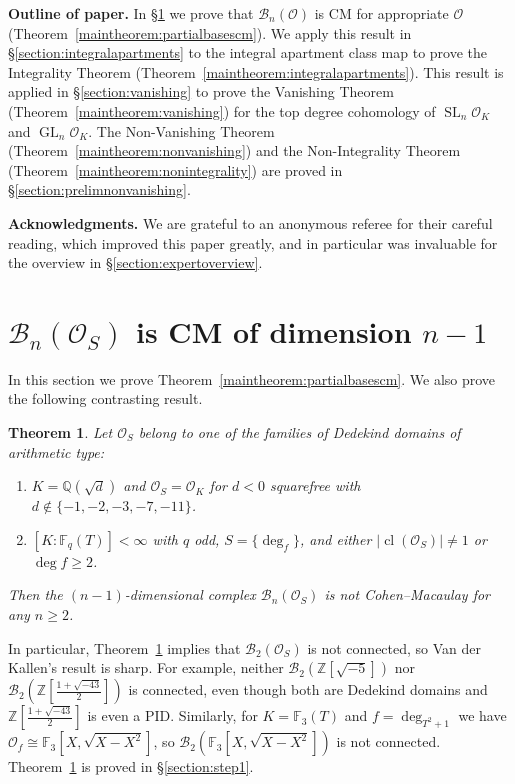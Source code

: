 \documentclass[11 pt]{article}
\theoremstyle{plain}
\newtheorem{theorem}{Theorem}[section]
\theoremstyle{definition}
\numberwithin{equation}{section}
\DeclareMathOperator{\GL}{GL}
\DeclareMathOperator{\SL}{SL}
\newcommand\Z{\ensuremath{\mathbb{Z}}}
\newcommand\Q{\ensuremath{\mathbb{Q}}}
\newcommand\F{\ensuremath{\mathbb{F}}}
\newcommand{\parasmallskip}[1]{\smallskip\noindent\textbf{#1.}}
\renewcommand{\O}{\mathcal{O}}
\newcommand\PartialBases{\ensuremath{\mathcal{B}}}
\newcommand{\PB}{\PartialBases}
\DeclareMathOperator{\class}{cl}
\newcommand\abs[1]{\left\lvert#1\right\rvert}
\newcommand\iso{\cong}
\newcommand{\change}{}
\begin{document}
\parasmallskip{Outline of paper}
In \S\ref{section:partialbasescm} we prove  that $\PB_n(\O)$ is CM for appropriate $\O$ (Theorem~\ref{maintheorem:partialbasescm}).   We apply this result in \S\ref{section:integralapartments} to the integral apartment class map to prove the Integrality Theorem (Theorem~\ref{maintheorem:integralapartments}).    This result is applied in \S\ref{section:vanishing} to prove the Vanishing Theorem (Theorem~\ref{maintheorem:vanishing})
for the top degree cohomology of $\SL_n\O_K$ and $\GL_n\O_K$.    The Non-Vanishing Theorem (Theorem~\ref{maintheorem:nonvanishing}) and the  Non-Integrality Theorem (Theorem~\ref{maintheorem:nonintegrality}) are proved in \S\ref{section:prelimnonvanishing}.

\parasmallskip{Acknowledgments} We are grateful to an anonymous referee for their careful reading, which improved this paper greatly, and in particular was invaluable for the overview in \S\ref{section:expertoverview}. \change

\section{\texorpdfstring{$\PartialBases_n(\O_S)$}{Bn(O)} is CM of dimension \texorpdfstring{$n-1$}{n-1}}
\label{section:partialbasescm}

In this section we prove Theorem~\ref{maintheorem:partialbasescm}.  We also prove the following contrasting result.

\begin{theorem}
\label{theorem:B2notconnected}
Let $\O_S$ belong to one of the families of Dedekind domains of arithmetic type:
\begin{enumerate}[topsep=4.5pt,itemsep=4.5pt,parsep=2.5pt]
\item $K=\Q(\sqrt{d})$ and $\O_S=\O_K$ for $d<0$ squarefree with $d\not\in \{-1,-2,-3,-7,-11\}$.
\item $[K: \F_q(T)]<\infty$ with $q$ odd, $S=\{\deg_f\}$, and either $\abs{\class(\O_S)} \neq 1$ or $\deg f\geq 2$.
\end{enumerate}
Then the $(n-1)$-dimensional complex $\PartialBases_n(\O_S)$ is not Cohen--Macaulay for any $n\geq 2$.
\end{theorem}

In particular, Theorem~\ref{theorem:B2notconnected} implies that $\PB_2(\O_S)$ is not connected, so Van der Kallen's result %
is sharp. For example, neither $\PB_2(\Z[\sqrt{-5}])$ nor $\PB_2(\Z[\frac{1+\sqrt{-43}}{2}])$ is connected, even though both are Dedekind domains and $\Z[\frac{1+\sqrt{-43}}{2}]$ is even a PID.
Similarly, for $K=\F_3(T)$ and $f=\deg_{T^2+1}$ we have $\O_f\iso \F_3[X,\sqrt{X-X^2}]$, so $\PB_2(\F_3[X,\sqrt{X-X^2}])$ is not connected. 
Theorem~\ref{theorem:B2notconnected} is proved in \S\ref{section:step1}.
\end{document}
